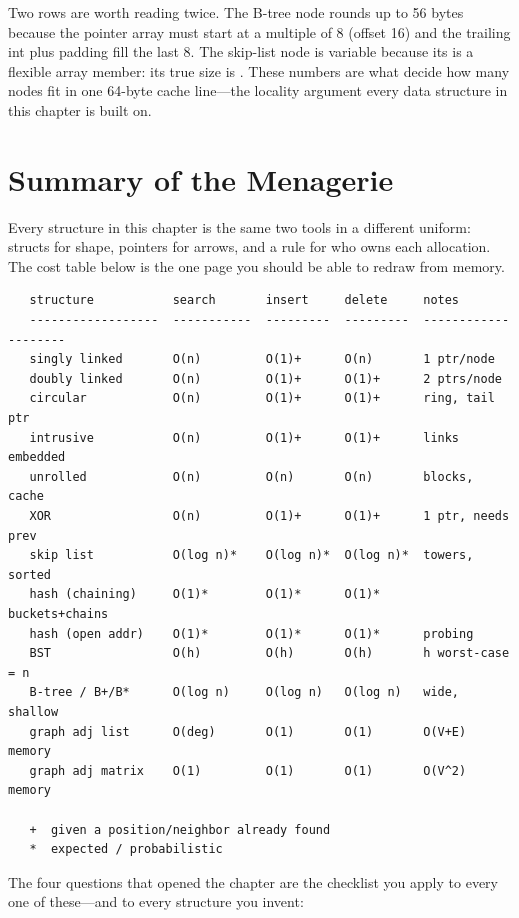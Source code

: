 Two rows are worth reading twice. The B-tree node rounds up to 56
bytes because the  pointer array must start at a
multiple of 8 (offset 16) and the trailing  int plus
padding fill the last 8. The skip-list node is variable because its
 is a flexible array member: its true size is
. These numbers
are what decide how many nodes fit in one 64-byte cache line---the
locality argument every data structure in this chapter is built on.

\section{Summary of the Menagerie}

Every structure in this chapter is the same two tools in a different
uniform: structs for shape, pointers for arrows, and a rule for who
owns each allocation. The cost table below is the one page you should
be able to redraw from memory.

\begin{verbatim}
   structure           search       insert     delete     notes
   ------------------  -----------  ---------  ---------  --------------------
   singly linked       O(n)         O(1)+      O(n)       1 ptr/node
   doubly linked       O(n)         O(1)+      O(1)+      2 ptrs/node
   circular            O(n)         O(1)+      O(1)+      ring, tail ptr
   intrusive           O(n)         O(1)+      O(1)+      links embedded
   unrolled            O(n)         O(n)       O(n)       blocks, cache
   XOR                 O(n)         O(1)+      O(1)+      1 ptr, needs prev
   skip list           O(log n)*    O(log n)*  O(log n)*  towers, sorted
   hash (chaining)     O(1)*        O(1)*      O(1)*      buckets+chains
   hash (open addr)    O(1)*        O(1)*      O(1)*      probing
   BST                 O(h)         O(h)       O(h)       h worst-case = n
   B-tree / B+/B*      O(log n)     O(log n)   O(log n)   wide, shallow
   graph adj list      O(deg)       O(1)       O(1)       O(V+E) memory
   graph adj matrix    O(1)         O(1)       O(1)       O(V^2) memory

   +  given a position/neighbor already found
   *  expected / probabilistic
\end{verbatim}

The four questions that opened the chapter are the checklist you apply
to every one of these---and to every structure you invent:

